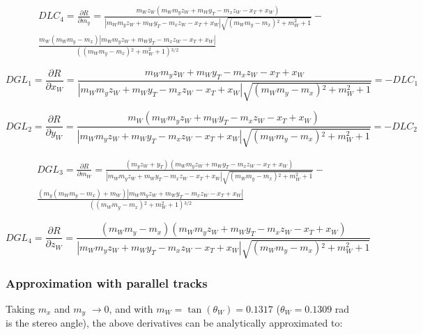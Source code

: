 \documentclass[a4paper,11pt]{article}
\begin{document}
\begin{equation}
\begin{split}
DLC_4 = \frac{ \partial R}{\partial m_y} = \frac{m_W z_W(m_W m_y z_W+m_W y_T-m_x z_W-x_T+x_W)}{|m_W m_y z_W+m_W y_T-m_x z_W-x_T+x_W|\sqrt{\left(m_W m_y-m_x\right){}^2+m_W^2+1}}-\\
\frac{m_W \left(m_W m_y-m_x\right) |m_W m_y z_W+m_W y_T-m_x z_W-x_T+x_W|}{\left(\left(m_W m_y-m_x\right){}^2+m_W^2+1\right){}^{3/2}}
\end{split}
\end{equation}


\begin{equation}	
DGL_1 = \frac{\partial R}{\partial x_W} = \frac{m_W m_y z_W+m_W y_T-m_x z_W-x_T+x_W}{|m_W m_y z_W+m_W y_T-m_x z_W-x_T+x_W|\sqrt{\left(m_W m_y-m_x\right){}^2+m_W^2+1}} = - DLC_1
\end{equation}

\begin{equation}	
DGL_2 = \frac{\partial R}{\partial y_W} = \frac{m_W (m_W m_y z_W+m_W y_T-m_x z_W-x_T+x_W)}{|m_W m_y z_W+m_W y_T-m_x z_W-x_T+x_W|\sqrt{\left(m_W m_y-m_x\right){}^2+m_W^2+1}}  = - DLC_2
\end{equation}


\begin{equation}
\begin{split}	
DGL_3 = \frac{\partial R}{\partial m_W} = \frac{(m_y z_W+y_T)(m_W m_y z_W+m_W y_T-m_x z_W-x_T+x_W)}{|m_W m_y z_W+m_W y_T-m_x z_W-x_T+x_W|\sqrt{\left(m_W m_y-m_x\right){}^2+m_W^2+1}}-\\
\frac{\left(m_y \left(m_W m_y-m_x\right)+ m_W\right) |m_W m_y z_W+m_W y_T-m_x z_W-x_T+x_W|}{ \left(\left(m_W m_y-m_x\right){}^2+m_W^2+1\right){}^{3/2}}
\end{split}
\end{equation}

\begin{equation}	
DGL_4 = \frac{\partial R}{\partial z_W} = \frac{(m_W m_y-m_x) (m_W m_y z_W+m_W y_T-m_x z_W-x_T+x_W)}{|m_W m_y z_W+m_W y_T-m_x z_W-x_T+x_W|\sqrt{\left(m_W m_y-m_x\right){}^2+m_W^2+1}}
\end{equation}

\subsubsection{Approximation with parallel tracks}

Taking $m_x$ and $m_y$ $\rightarrow 0$, and with $m_W = \tan(\theta_W)=0.1317$ ($\theta_W = 0.1309$ rad is the stereo angle), the above derivatives can be analytically approximated to:
\end{document}
